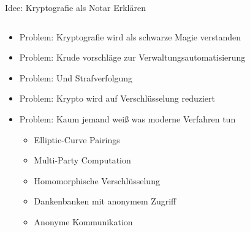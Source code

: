 \documentclass{rosenpass-beamer}
\begin{document}
\begin{frame}{Idee: Kryptografie als Notar Erklären}
\begin{columns}[c]

\begin{column}{0.7\textwidth}
  \begin{itemize}
    \item Problem: Kryptografie wird als schwarze Magie verstanden
    \item Problem: Krude vorschläge zur Verwaltungsautomatisierung
    \item Problem: Und Strafverfolgung
    \item Problem: Krypto wird auf Verschlüsselung reduziert
    \item
      Problem: Kaum jemand weiß was moderne Verfahren tun
      \begin{itemize}
        \item Elliptic-Curve Pairings
        \item Multi-Party Computation
        \item Homomorphische Verschlüsselung
        \item Dankenbanken mit anonymem Zugriff
        \item Anonyme Kommunikation
      \end{itemize}
  \end{itemize}
\end{column}


\end{columns}
\end{frame}
\end{document}
